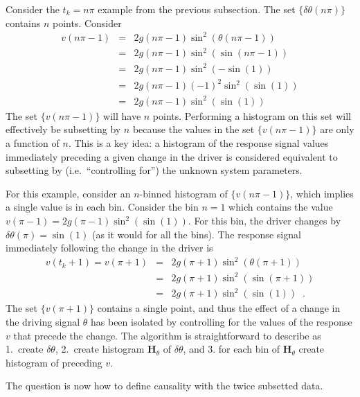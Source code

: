 \documentclass[a4paper,11pt]{article}
\begin{document}
Consider the $t_k=n\pi$ example from the previous subsection.  The set $\{\delta\theta(n\pi)\}$ contains $n$ points.  Consider
\begin{eqnarray*}
v(n\pi-1) &=& 2g\left(n\pi-1\right)\sin^2 \left(\theta(n\pi-1)\right)\\
&=& 2g\left(n\pi-1\right)\sin^2 \left(\sin(n\pi-1)\right)\\
&=& 2g\left(n\pi-1\right)\sin^2 \left(-\sin(1)\right)\\
&=& 2g\left(n\pi-1\right)\left(-1\right)^2\sin^2 \left(\sin(1)\right)\\
&=& 2g\left(n\pi-1\right)\sin^2 \left(\sin(1)\right)
\end{eqnarray*}
The set $\{v(n\pi-1)\}$ will have $n$ points.  Performing a histogram on this set will effectively be subsetting by $n$ because the values in the set $\{v(n\pi-1)\}$ are only a function of $n$.  This is a key idea: a histogram of the response signal values immediately preceding a given change in the driver is considered equivalent to subsetting by (i.e.\ ``controlling for'') the unknown system parameters.

For this example, consider an $n$-binned histogram of $\{v(n\pi-1)\}$, which implies a single value is in each bin.  Consider the bin $n=1$ which contains the value $v(\pi-1)=2g\left(\pi-1\right)\sin^2 \left(\sin(1)\right)$.  For this bin, the driver changes by $\delta\theta(\pi)=\sin(1)$ (as it would for all the bins).  The response signal immediately following the change in the driver is 
\begin{eqnarray*}
v(t_k+1) = v(\pi+1) &=& 2g\left(\pi+1\right)\sin^2 \left(\theta(\pi+1)\right)\\
&=& 2g\left(\pi+1\right)\sin^2 \left(\sin(\pi+1)\right)\\
&=& 2g\left(\pi+1\right)\sin^2 \left(\sin(1)\right)\;\;.
\end{eqnarray*}
The set $\{v(\pi+1)\}$ contains a single point, and thus the effect of a change in the driving signal $\theta$ has been isolated by controlling for the values of the response $v$ that precede the change.  The algorithm is straightforward to describe as 1.\ create $\delta\theta$, 2.\ create histogram $\mathbf{H}_\theta$ of $\delta\theta$, and 3. for each bin of $\mathbf{H}_\theta$ create histogram of preceding $v$.  

The question is now how to define causality with the twice subsetted data.
\end{document}
